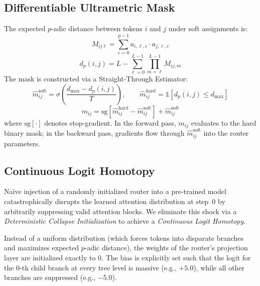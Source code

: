 \documentclass[11pt,a4paper]{article}
\begin{document}
\subsection{Differentiable Ultrametric Mask}

The expected $p$-adic distance between tokens $i$ and $j$ under soft assignments is:
\begin{equation}
    M_{ij\ell} = \sum_{c=0}^{p-1} a_{i,\ell,c} \cdot a_{j,\ell,c}
\end{equation}
\begin{equation}
    d_p(i,j) = L - \sum_{\ell=0}^{L-1} \prod_{m=\ell}^{L-1} M_{ij,m}
    \label{eq:distance}
\end{equation}
The mask is constructed via a Straight-Through Estimator:
\begin{equation}
    \hat{m}_{ij}^{\text{soft}} = \sigma\!\left(\frac{d_{\max} - d_p(i,j)}{T}\right), \qquad
    \hat{m}_{ij}^{\text{hard}} = \mathbb{1}\!\left[d_p(i,j) \leq d_{\max}\right]
\end{equation}
\begin{equation}
    m_{ij} = \text{sg}\!\left[\hat{m}_{ij}^{\text{hard}} - \hat{m}_{ij}^{\text{soft}}\right] + \hat{m}_{ij}^{\text{soft}}
    \label{eq:ste}
\end{equation}
where $\text{sg}[\cdot]$ denotes stop-gradient. In the forward pass, $m_{ij}$ evaluates to the hard binary mask; in the backward pass, gradients flow through $\hat{m}_{ij}^{\text{soft}}$ into the router parameters.

\subsection{Continuous Logit Homotopy}
\label{sec:homotopy}

Na\"ive injection of a randomly initialized router into a pre-trained model catastrophically disrupts the learned attention distribution at step~0 by arbitrarily suppressing valid attention blocks. We eliminate this shock via a \emph{Deterministic Collapse Initialization} to achieve a \emph{Continuous Logit Homotopy}.

Instead of a uniform distribution (which forces tokens into disparate branches and maximizes expected $p$-adic distance), the weights of the router's projection layer are initialized exactly to 0. The bias is explicitly set such that the logit for the 0-th child branch at every tree level is massive (e.g., $+5.0$), while all other branches are suppressed (e.g., $-5.0$).
\end{document}
